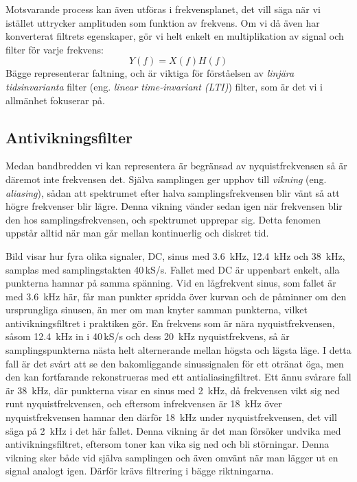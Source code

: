 Motsvarande process kan även utföras i frekvensplanet, det vill säga när vi 
istället uttrycker amplituden som funktion av frekvens.
Om vi då även har konverterat filtrets egenskaper, gör vi helt enkelt en
multiplikation av signal och filter för varje frekvens:
\[Y(f) = X(f)H(f)\]
Bägge representerar faltning, och är viktiga för förståelsen av \emph{linjära
tidsinvarianta} filter (eng. \emph{linear time-invariant (LTI)}) filter,
som är det vi i allmänhet fokuserar på.

\subsection{Antivikningsfilter}

Medan bandbredden vi kan representera är begränsad av nyquistfrekvensen så
är däremot inte frekvensen det.
Själva samplingen ger upphov till \emph{vikning} (eng. \emph{aliasing}),
sådan att spektrumet efter halva samplingsfrekvensen blir vänt så att högre
frekvenser blir lägre.
Denna vikning vänder sedan igen när frekvensen blir den hos
samplingsfrekvensen, och spektrumet upprepar sig.
Detta fenomen uppstår alltid när man går mellan kontinuerlig och diskret tid.


Bild  visar hur fyra olika signaler, DC, sinus med
\qty{3,6}{\kilo\hertz}, \qty{12,4}{\kilo\hertz} och \qty{38}{\kilo\hertz}, samplas
med samplingstakten 40\,kS/s.
Fallet med DC är uppenbart enkelt, alla punkterna hamnar på samma spänning.
Vid en lågfrekvent sinus, som fallet är med \qty{3,6}{\kilo\hertz} här, får man
punkter spridda över kurvan och de påminner om den ursprungliga sinusen, än mer
om man knyter samman punkterna, vilket antivikningsfiltret i praktiken gör.
En frekvens som är nära nyquistfrekvensen, såsom \qty{12,4}{\kilo\hertz} in i
40\,kS/s och dess \qty{20}{\kilo\hertz} nyquistfrekvens, så är samplingspunkterna
nästa helt alternerande mellan högsta och lägsta läge.
I detta fall är det svårt att se den bakomliggande sinussignalen för ett otränat
öga, men den kan fortfarande rekonstrueras med ett antialiasingfiltret.
Ett ännu svårare fall är \qty{38}{\kilo\hertz}, där punkterna visar en sinus med
\qty{2}{\kilo\hertz}, då frekvensen vikt sig ned runt nyquistfrekvensen, och
eftersom infrekvensen är \qty{18}{\kilo\hertz} över nyquistfrekvensen hamnar den
därför \qty{18}{\kilo\hertz} under nyquistfrekvensen, det vill säga på
\qty{2}{\kilo\hertz} i det här fallet.
Denna vikning är det man försöker undvika med antivikningsfiltret, eftersom
toner kan vika sig ned och bli störningar.
Denna vikning sker både vid själva samplingen och även omvänt när man lägger ut
en signal analogt igen. Därför krävs filtrering i bägge riktningarna.

